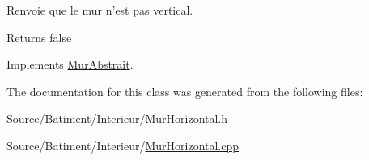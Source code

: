Renvoie que le mur n'est pas vertical. 

\begin{DoxyReturn}{Returns}
false 
\end{DoxyReturn}


Implements \hyperlink{classMurAbstrait_aeb0dc942a444fa8637839a715d49068a}{Mur\-Abstrait}.



The documentation for this class was generated from the following files\-:\begin{DoxyCompactItemize}
\item 
Source/\-Batiment/\-Interieur/\hyperlink{MurHorizontal_8h}{Mur\-Horizontal.\-h}\item 
Source/\-Batiment/\-Interieur/\hyperlink{MurHorizontal_8cpp}{Mur\-Horizontal.\-cpp}\end{DoxyCompactItemize}
